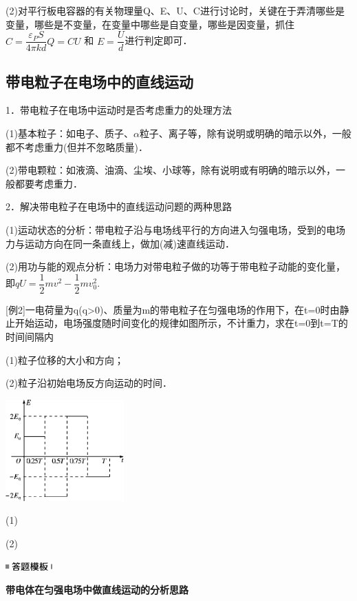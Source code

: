 (2)对平行板电容器的有关物理量Q、E、U、C进行讨论时，关键在于弄清哪些是变量，哪些是不变量，在变量中哪些是自变量，哪些是因变量，抓住$C=\dfrac{\varepsilon_{P} S}{4 \pi k d} Q=C U$ 和 $E=\dfrac{U}{d}$进行判定即可．
\newpage
\subsection{带电粒子在电场中的直线运动}

1．带电粒子在电场中运动时是否考虑重力的处理方法

(1)基本粒子：如电子、质子、$\alpha$粒子、离子等，除有说明或明确的暗示以外，一般都不考虑重力(但并不忽略质量)．

(2)带电颗粒：如液滴、油滴、尘埃、小球等，除有说明或有明确的暗示以外，一般都要考虑重力．

2．解决带电粒子在电场中的直线运动问题的两种思路

(1)运动状态的分析：带电粒子沿与电场线平行的方向进入匀强电场，受到的电场力与运动方向在同一条直线上，做加(减)速直线运动．

(2)用功与能的观点分析：电场力对带电粒子做的功等于带电粒子动能的变化量，即$q U=\dfrac{1}{2} m v^{2}-\dfrac{1}{2} m v_{0}^2$.

{[}例2{]}一电荷量为q(q\textgreater0)、质量为m的带电粒子在匀强电场的作用下，在t=0时由静止开始运动，电场强度随时间变化的规律如图所示，不计重力，求在t=0到t=T的时间间隔内

(1)粒子位移的大小和方向；

(2)粒子沿初始电场反方向运动的时间．

\begin{center}\includegraphics[width=1.79167in,height=1.53125in]{media/image297.png}\end{center}
\begin{solution}
	(1)
	
	(2)
\end{solution}

\begin{center}\includegraphics[width=0.70833in,height=0.125in]{media/image25.png}

\textbf{带电体在匀强电场中做直线运动的分析思路}
\end{center}


